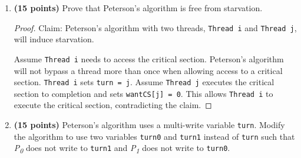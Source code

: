 \documentclass[11pt]{article}
\begin{document}
\begin{enumerate}
\begin{proof}
		Assume \texttt{Thread i} enters the critical section. Since \texttt{Thread j} is of higher priority than \texttt{Thread i} (i.e. $j < i$ in line 28 of Figure~2.7 of the textbook), \texttt{Thread j} also enters the critical section, breaking the principle of mutual exclusion.
	\end{proof}
\item \textbf{(15 points)} Prove that Peterson's algorithm is free from starvation.
\begin{proof}
	Claim: Peterson's algorithm with two threads, \texttt{Thread i} and \texttt{Thread j}, will induce starvation. 
	
	Assume \texttt{Thread i} needs to access the critical section. Peterson's algorithm will not bypass a thread more than once when allowing access to a critical section. \texttt{Thread i} sets \texttt{turn = j}. Assume \texttt{Thread j} executes the critical section to completion and sets \texttt{wantCS[j] = 0}. This allows \texttt{Thread i} to execute the critical section, contradicting the claim.
\end{proof}

\item \textbf{(15 points)} Peterson's algorithm uses a multi-write variable
  \texttt{turn}. Modify the algorithm to use two variables \texttt{turn0} and
  \texttt{turn1} instead of \texttt{turn} such that \emph{P\textsubscript{0}}
  does not write to \texttt{turn1} and \emph{P\textsubscript{1}} does not write
  to \texttt{turn0}.
  

\end{enumerate}
\end{document}
